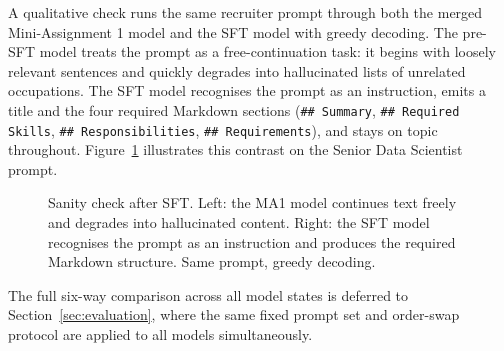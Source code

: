 \documentclass[../main.tex]{subfiles}
\begin{document}
A qualitative check runs the same recruiter prompt through both the merged Mini-Assignment 1 model and the SFT model with greedy decoding. The pre-SFT model treats the prompt as a free-continuation task: it begins with loosely relevant sentences and quickly degrades into hallucinated lists of unrelated occupations. The SFT model recognises the prompt as an instruction, emits a title and the four required Markdown sections (\texttt{\#\# Summary}, \texttt{\#\# Required Skills}, \texttt{\#\# Responsibilities}, \texttt{\#\# Requirements}), and stays on topic throughout. Figure~\ref{fig:sft_sanity} illustrates this contrast on the Senior Data Scientist prompt.

\begin{figure}[h]
\centering
\small
{}%
\hfill
{}
\caption{Sanity check after SFT. Left: the MA1 model
continues text freely and degrades into hallucinated
content. Right: the SFT model recognises the prompt as
an instruction and produces the required Markdown
structure. Same prompt, greedy decoding.}
\label{fig:sft_sanity}
\end{figure}


The full six-way comparison across all model states is deferred to Section~\ref{sec:evaluation}, where the same fixed prompt set and order-swap protocol are applied to all models simultaneously.
\end{document}
